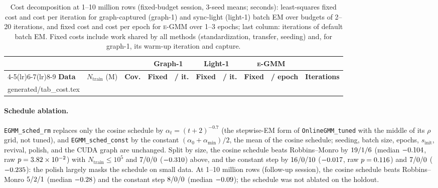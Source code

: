 \documentclass[10pt]{article} %
\makeatletter
\newcommand{\egmm}{\textsc{e-GMM}}
\newcommand{\gentable}[1]{\@@input generated/#1.tex }
\makeatother
\begin{document}
\begin{table}[htbp]
\centering
\caption{Cost decomposition at 1--10 million rows (fixed-budget session, 3-seed means; seconds): least-squares fixed cost and cost per iteration for graph-captured (graph-1) and sync-light (light-1) batch EM over budgets of 2--20 iterations, and fixed cost and cost per epoch for \egmm{} over 1--3 epochs; last column: iterations of default batch EM. Fixed costs include work shared by all methods (standardization, transfer, seeding) and, for graph-1, its warm-up iteration and capture.}
\label{tab:cost}
\small
\setlength{\tabcolsep}{4.0pt}
\begin{tabular}{lccccccccc}
\toprule
& & & \multicolumn{2}{c}{\textbf{Graph-1}} & \multicolumn{2}{c}{\textbf{Light-1}} & \multicolumn{2}{c}{\textbf{\egmm{}}} & \\
\cmidrule(lr){4-5}\cmidrule(lr){6-7}\cmidrule(lr){8-9}
\textbf{Data} & $N_{\mathrm{train}}$ (M) & \textbf{Cov.} & \textbf{Fixed} & \textbf{/ it.} & \textbf{Fixed} & \textbf{/ it.} & \textbf{Fixed} & \textbf{/ epoch} & \textbf{Iterations} \\
\midrule
\gentable{tab_cost}
\bottomrule
\end{tabular}
\end{table}

\paragraph{Schedule ablation.} \texttt{EGMM\_sched\_rm} replaces only the cosine schedule by $\alpha_t = (t+2)^{-0.7}$ (the stepwise-EM form of \texttt{OnlineGMM\_tuned} with the middle of its $\rho$ grid, not tuned), and \texttt{EGMM\_sched\_const} by the constant $(\alpha_0 + \alpha_{\min})/2$, the mean of the cosine schedule; seeding, batch size, epochs, $s_{\mathrm{init}}$, revival, polish, and the CUDA graph are unchanged. Split by size, the cosine schedule beats Robbins--Monro by $19/1/6$ (median $-0.104$, raw $p = 3.82\times 10^{-2}$) with $N_{\mathrm{train}} \le 10^5$ and $7/0/0$ ($-0.310$) above, and the constant step by $16/0/10$ ($-0.017$, raw $p = 0.116$) and $7/0/0$ ($-0.235$): the polish largely masks the schedule on small data. At 1--10 million rows (follow-up session), the cosine schedule beats Robbins--Monro $5/2/1$ (median $-0.28$) and the constant step $8/0/0$ (median $-0.09$); the schedule was not ablated on the holdout.
\end{document}
